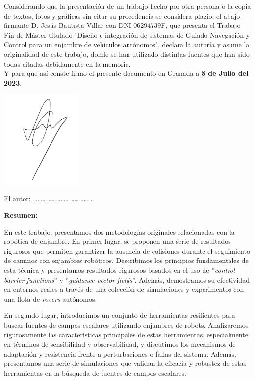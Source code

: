 \newpage
\thispagestyle{empty} %

Considerando que la presentación de un trabajo hecho por otra persona o la copia de
textos, fotos y gráficas sin citar su procedencia se considera plagio, el abajo firmante D. Jesús Bautista Villar con DNI 06294739F, que presenta el Trabajo Fin de Máster titulado "Diseño e integración de sistemas de Guiado Navegación y Control para un enjambre de vehículos autónomos", declara la autoría y asume la originalidad de este trabajo, donde se han utilizado
distintas fuentes que han sido todas citadas debidamente en la memoria.\\

Y para que así conste firmo el presente documento en Granada a \textbf{8 de Julio del 2023}.\\

\vspace{2cm}

{\includegraphics[trim={-7cm 0cm 0cm 0cm}, clip, width=0.3\textwidth]{fig/sign.png}}

El autor: ……………………………… .

\newpage
\thispagestyle{empty} %

{\bfseries \large Resumen:} \vspace{5mm}

En este trabajo, presentamos dos metodologías originales relacionadas con la robótica de enjambre. En primer lugar, se proponen una serie de resultados rigurosos que permiten garantizar la ausencia de colisiones durante el seguimiento de caminos con enjambres robóticos. Describimos los principios fundamentales de esta técnica y presentamos resultados rigurosos basados en el uso de ''\textit{control barrier functions}'' y ''\textit{guidance vector fields}''. Además, demostramos su efectividad en entornos reales a través de una colección de simulaciones y experimentos con una flota de \textit{rovers} autónomos.

En segundo lugar, introducimos un conjunto de herramientas resilientes para buscar fuentes de campos escalares utilizando enjambres de robots. Analizaremos rigurosamente las características principales de estas herramientas, especialmente en términos de sensibilidad y observabilidad, y discutimos los mecanismos de adaptación y resistencia frente a perturbaciones o fallas del sistema. Además, presentamos una serie de simulaciones que validan la eficacia y robustez de estas herramientas en la búsqueda de fuentes de campos escalares.


